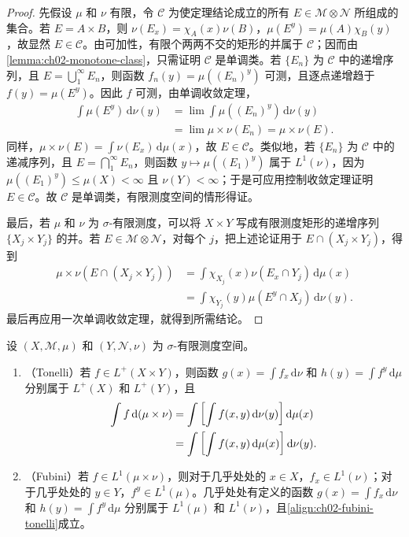 \documentclass[../../main.tex]{subfiles}%
\begin{document}
\begin{proof}
先假设 $\mu$ 和 $\nu$ 有限，令 $\mathscr{C}$ 为使定理结论成立的所有 $E\in\mathscr{M}\otimes\mathscr{N}$ 所组成的集合。若 $E=A\times B$，则 $\nu(E_x)=\chi_A(x)\nu(B)$，$\mu(E^y)=\mu(A)\chi_B(y)$，故显然 $E\in\mathscr{C}$。由可加性，有限个两两不交的矩形的并属于 $\mathscr{C}$；因而由\cref{lemma:ch02-monotone-class}，只需证明 $\mathscr{C}$ 是单调类。若 $\{E_n\}$ 为 $\mathscr{C}$ 中的递增序列，且 $E=\bigcup_1^\infty E_n$，则函数 $f_n(y)=\mu((E_n)^y)$ 可测，且逐点递增趋于 $f(y)=\mu(E^y)$。因此 $f$ 可测，由单调收敛定理，
\begin{align*}
\int\mu(E^y)\,\mathrm{d}\nu(y)
&=\lim\int\mu((E_n)^y)\,\mathrm{d}\nu(y)\\
&=\lim\mu\times\nu(E_n)=\mu\times\nu(E).
\end{align*}
同样，$\mu\times\nu(E)=\int\nu(E_x)\,\mathrm{d}\mu(x)$，故 $E\in\mathscr{C}$。类似地，若 $\{E_n\}$ 为 $\mathscr{C}$ 中的递减序列，且 $E=\bigcap_1^\infty E_n$，则函数 $y\mapsto\mu((E_1)^y)$ 属于 $L^1(\nu)$，因为 $\mu((E_1)^y)\le\mu(X)<\infty$ 且 $\nu(Y)<\infty$；于是可应用控制收敛定理证明 $E\in\mathscr{C}$。故 $\mathscr{C}$ 是单调类，有限测度空间的情形得证。

最后，若 $\mu$ 和 $\nu$ 为 $\sigma$-有限测度，可以将 $X\times Y$ 写成有限测度矩形的递增序列 $\{X_j\times Y_j\}$ 的并。若 $E\in\mathscr{M}\otimes\mathscr{N}$，对每个 $j$，把上述论证用于 $E\cap(X_j\times Y_j)$，得到
\begin{align*}
\mu\times\nu(E\cap(X_j\times Y_j))
&=\int\chi_{X_j}(x)\nu(E_x\cap Y_j)\,\mathrm{d}\mu(x)\\
&=\int\chi_{Y_j}(y)\mu(E^y\cap X_j)\,\mathrm{d}\nu(y).
\end{align*}
最后再应用一次单调收敛定理，就得到所需结论。
\end{proof}
\begin{theorem}\label{theorem:ch02-fubini-tonelli}
设 $(X,\mathscr{M},\mu)$ 和 $(Y,\mathscr{N},\nu)$ 为 $\sigma$-有限测度空间。
\begin{enumerate}
\item\label{item:ch02-tonelli} （Tonelli）若 $f\in L^+(X\times Y)$，则函数 $g(x)=\int f_x\,\mathrm{d}\nu$ 和 $h(y)=\int f^y\,\mathrm{d}\mu$ 分别属于 $L^+(X)$ 和 $L^+(Y)$，且
\begin{align}\label{align:ch02-fubini-tonelli}
\int f\,\mathrm{d}(\mu\times\nu)
&=\int\left[\int f(x,y)\,\mathrm{d}\nu(y)\right]\mathrm{d}\mu(x)\notag\\
&=\int\left[\int f(x,y)\,\mathrm{d}\mu(x)\right]\mathrm{d}\nu(y).
\end{align}
\item\label{item:ch02-fubini} （Fubini）若 $f\in L^1(\mu\times\nu)$，则对于几乎处处的 $x\in X$，$f_x\in L^1(\nu)$；对于几乎处处的 $y\in Y$，$f^y\in L^1(\mu)$。几乎处处有定义的函数 $g(x)=\int f_x\,\mathrm{d}\nu$ 和 $h(y)=\int f^y\,\mathrm{d}\mu$ 分别属于 $L^1(\mu)$ 和 $L^1(\nu)$，且\eqref{align:ch02-fubini-tonelli}成立。
\end{enumerate}
\end{theorem}
\end{document}
